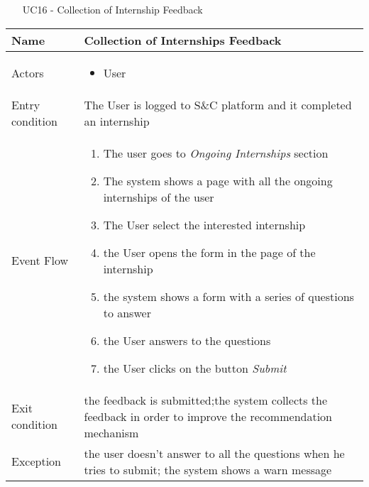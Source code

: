 						\begin{table} [H]
					\centering
					\begin{itemize}
						\item [UC16] - Collection of Internship Feedback
					\end{itemize}
					
					\begin{tabular}{|| P{7.5cm} | P{7.5cm} ||}
						\hline
						Name & Collection of Internships Feedback \\
						\hline
						Actors & \parbox{5cm}{\begin{itemize}
								\item User
							\end{itemize}
						} \\
						\hline
						Entry condition & The User is logged to S\&C platform and it completed an internship \\
						\hline
						Event Flow & \parbox{5cm}{\begin{enumerate}[label=\alpha]
								\item The user goes to \textit{Ongoing Internships} section
								\item The system shows a page with 
								all the ongoing internships of the user 
								\item The User select the interested 
								internship  
								\item the User opens the form in the page of the internship
								\item the system shows a form with a series of questions to answer 
								\item the User answers to the questions
								\item the User clicks on the button \textit{Submit}
						\end{enumerate}} \\
						\hline 
						Exit condition & the feedback is submitted;the system collects the
						feedback in order to improve the recommendation
						mechanism \\
						\hline
						Exception & the user doesn't answer to all the questions when he tries to submit; the system shows a warn message \\
						\hline
					\end{tabular}
				\end{table}
				
